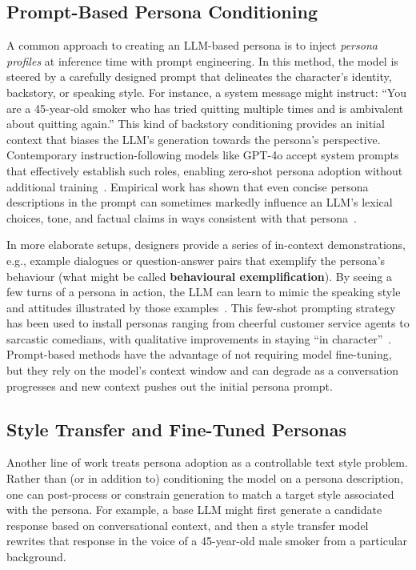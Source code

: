\subsection{Prompt-Based Persona Conditioning}
A common approach to creating an LLM-based persona is to inject \emph{persona profiles} at inference time with prompt engineering. In this method, the model is steered by a carefully designed prompt that delineates the character's identity, backstory, or speaking style. For instance, a system message might instruct: ``You are a 45-year-old smoker who has tried quitting multiple times and is ambivalent about quitting again.'' This kind of backstory conditioning provides an initial context that biases the LLM's generation towards the persona's perspective. Contemporary instruction-following models like GPT-4o accept system prompts that effectively establish such roles, enabling zero-shot persona adoption without additional training~\cite{10.5555/3600270.3602281}. Empirical work has shown that even concise persona descriptions in the prompt can sometimes markedly influence an LLM's lexical choices, tone, and factual claims in ways consistent with that persona~\cite{madotto-etal-2019-personalizing, liu-etal-2024-evaluating-large}.

In more elaborate setups, designers provide a series of in-context demonstrations, e.g., example dialogues or question-answer pairs that exemplify the persona's behaviour (what might be called \textbf{behavioural exemplification}). By seeing a few turns of a persona in action, the LLM can learn to mimic the speaking style and attitudes illustrated by those examples~\cite{joshi-etal-2023-persona}. This few-shot prompting strategy has been used to install personas ranging from cheerful customer service agents to sarcastic comedians, with qualitative improvements in staying ``in character''~\cite{gururangan-etal-2020-dont}. Prompt-based methods have the advantage of not requiring model fine-tuning, but they rely on the model's context window and can degrade as a conversation progresses and new context pushes out the initial persona prompt.

\subsection{Style Transfer and Fine-Tuned Personas}
Another line of work treats persona adoption as a controllable text style problem. Rather than (or in addition to) conditioning the model on a persona description, one can post-process or constrain generation to match a target style associated with the persona. For example, a base LLM might first generate a candidate response based on conversational context, and then a style transfer model rewrites that response in the voice of a 45-year-old male smoker from a particular background.

